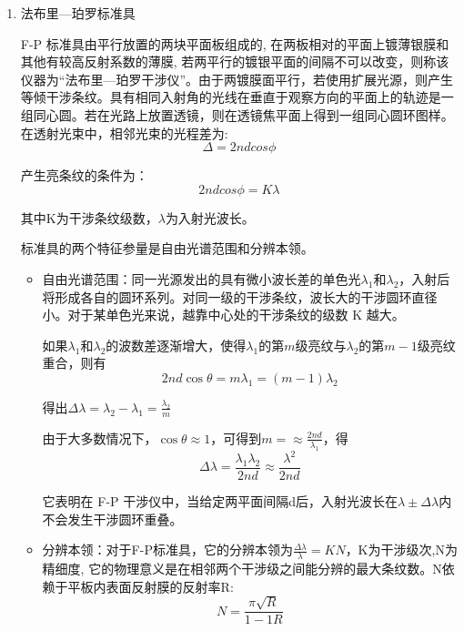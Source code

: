 \documentclass[dvipsnames, svgnames,a4paper,11pt]{article}
\begin{document}
		\begin{enumerate}
			\item 法布里—珀罗标准具

				F-P 标准具由平行放置的两块平面板组成的, 在两板相对的平面上镀薄银膜和其他有较高反射系数的薄膜, 若两平行的镀银平面的间隔不可以改变，则称该仪器为“法布里—珀罗干涉仪”。由于两镀膜面平行，若使用扩展光源，则产生等倾干涉条纹。具有相同入射角的光线在垂直于观察方向的平面上的轨迹是一组同心圆。若在光路上放置透镜，则在透镜焦平面上得到一组同心圆环图样。 在透射光束中，相邻光束的光程差为:
				\[
					\Delta = 2 n d cos \phi	
				\]

				产生亮条纹的条件为：
				\[
					2 n d cos \phi = K \lambda
				\]

				其中K为干涉条纹级数，$\lambda$为入射光波长。

				标准具的两个特征参量是自由光谱范围和分辨本领。
					
					\begin{itemize}
						\item 自由光谱范围：同一光源发出的具有微小波长差的单色光$\lambda_1$和$\lambda_2$，入射后将形成各自的圆环系列。对同一级的干涉条纹，波长大的干涉圆环直径小。对于某单色光来说，越靠中心处的干涉条纹的级数 K 越大。
						
						如果$\lambda_1$和$\lambda_2$的波数差逐渐增大，使得$\lambda_1$的第$m$级亮纹与$\lambda_2$的第$m - 1$级亮纹重合，则有
						\[
							2 n d \cos \theta = m \lambda _1 = (m - 1)\lambda_2	
						\]

						得出$\Delta \lambda = \lambda _2 - \lambda_1 = \frac{\lambda_2}{m}$

						由于大多数情况下，$\cos \theta \approx 1$，可得到$m = \approx \frac{2 n d}{\lambda_1}$，得
						\[
							\Delta \lambda = \frac{\lambda_1 \lambda_2}{2 n d} \approx \frac{\lambda^2}{2 n d}	
						\]
						

						它表明在 F-P 干涉仪中，当给定两平面间隔d后，入射光波长在$\lambda \pm \Delta \lambda$内不会发生干涉圆环重叠。

						\item 分辨本领：对于F-P标准具，它的分辨本领为$\frac{\Delta \lambda}{\lambda} = K N$，K为干涉级次,N为精细度, 它的物理意义是在相邻两个干涉级之间能分辨的最大条纹数。N依赖于平板内表面反射膜的反射率R:
						\[
							N = \frac{\pi \sqrt{R}}{1 -1R}	
						\]


\end{itemize}
\end{enumerate}
\end{document}
